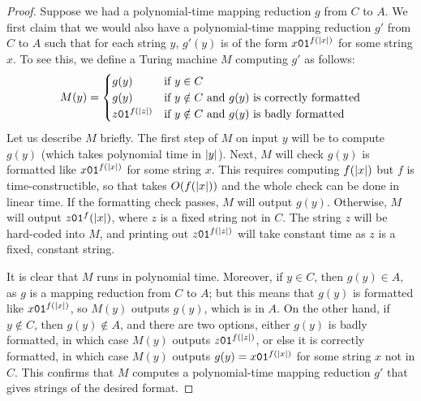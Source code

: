 \begin{proof}
  Suppose we had a polynomial-time mapping reduction $g$ from $C$ to $A$. We first claim that we would also have a polynomial-time mapping reduction $g'$ from $C$ to $A$ such that for each string $y$, $g'(y)$ is of the form $x\texttt{0}\texttt{1}^{f(| x |)}$ for some string $x$. To see this, we define a Turing machine $M$ computing $g'$ as follows:
  \begin{align*}
    M(y) =
    \begin{cases}
      g(y) & \text{if $y \in C$} \\
      g(y) & \text{if $y \notin C$ and $g(y)$ is correctly formatted} \\
      z\texttt{0}\texttt{1}^{f(| z |)} & \text{if $y \notin C$ and $g(y)$ is badly formatted}
    \end{cases}
  \end{align*}
  Let us describe $M$ briefly. The first step of $M$ on input $y$ will be to compute $g(y)$ (which takes polynomial time in $| y |$). Next, $M$ will check $g(y)$ is formatted like $x\texttt{0}\texttt{1}^{f(| x |)}$ for some string $x$. This requires computing $f(| x |)$ but $f$ is time-constructible, so that takes $O(f(| x |))$ and the whole check can be done in linear time. If the formatting check passes, $M$ will output $g(y)$. Otherwise, $M$ will output $z\texttt{0}\texttt{1}^f(| x |)$, where $z$ is a fixed string not in $C$. The string $z$ will be hard-coded into $M$, and printing out $z\texttt{0}\texttt{1}^{f(| z |)}$ will take constant time as $z$ is a fixed, constant string.

  It is clear that $M$ runs in polynomial time. Moreover, if $y \in C$, then $g(y) \in A$, as $g$ is a mapping reduction from $C$ to $A$; but this means that $g(y)$ is formatted like $x\texttt{0}\texttt{1}^{f(| x |)}$, so $M(y)$ outputs $g(y)$, which is in $A$. On the other hand, if $y \notin C$, then $g(y) \notin A$, and there are two options, either $g(y)$ is badly formatted, in which case $M(y)$ outputs $z\texttt{0}\texttt{1}^{f(| z |)}$, or else it is correctly formatted, in which case $M(y)$ outputs $g(y) = x\texttt{0}\texttt{1}^{f(| x |)}$ for some string $x$ not in $C$. This confirms that $M$ computes a polynomial-time mapping reduction $g'$ that gives strings of the desired format.


\end{proof}
